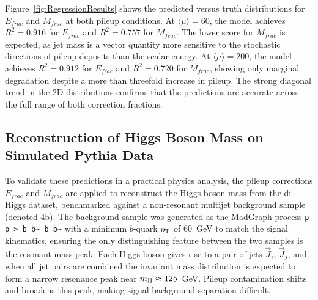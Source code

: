 Figure~\ref{fig:RegressionResults} shows the predicted versus truth distributions for $E_{frac}$ and $M_{frac}$ at both pileup conditions. 
At $\langle\mu\rangle=60$, the model achieves $R^2=0.916$ for $E_{frac}$ and $R^2=0.757$ for $M_{frac}$. 
The lower score for $M_{frac}$ is expected, as jet mass is a vector quantity more sensitive to the stochastic directions of pileup deposits than the scalar energy. 
At $\langle\mu\rangle=200$, the model achieves $R^2=0.912$ for $E_{frac}$ and $R^2=0.720$ for $M_{frac}$, showing only marginal degradation despite a more than threefold increase in pileup. 
The strong diagonal trend in the 2D distributions confirms that the predictions are accurate across the full range of both correction fractions.

\subsection{Reconstruction of Higgs Boson Mass on Simulated Pythia Data}

To validate these predictions in a practical physics analysis, the pileup corrections $E_{frac}$ and $M_{frac}$ are applied to reconstruct the Higgs boson mass from the di-Higgs dataset, benchmarked against a non-resonant multijet background sample (denoted 4b). 
The background sample was generated as the MadGraph process \texttt{p p > b b\~{} b b\~{}} with a minimum $b$-quark $p_{\rm T}$ of 60~GeV to match the signal kinematics, ensuring the only distinguishing feature between the two samples is the resonant mass peak. 
Each Higgs boson gives rise to a pair of jets $\overrightarrow{J}_i$, $\overrightarrow{J}_j$, and when all jet pairs are combined the invariant mass distribution is expected to form a narrow resonance peak near $m_{\rm H}\approx125$~GeV. 
Pileup contamination shifts and broadens this peak, making signal-background separation difficult.

